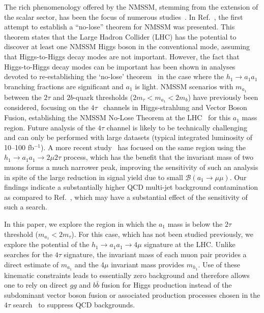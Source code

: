\documentclass[aps,prl,twocolumn,nofootinbib,superscriptaddress]{revtex4}
\begin{document}
The rich phenomenology offered by the NMSSM, stemming from the
extension of the scalar sector, has been the focus of numerous
studies~\cite{nmssm-ph1,nmssm-ph2,nmssm-ph2b,nmssm-ph3,nmssm-ph4,nmssm-ph5,nmssm-ph6,nmssm-ph6a,nmssm-ph7}.
In Ref.~\cite{nmssm-ph2}, the first attempt to establish a ``no-lose''
theorem for NMSSM was presented.  This theorem states that the Large
Hadron Collider (LHC) has the potential to discover at least one NMSSM
Higgs boson in the conventional mode, assuming that Higgs-to-Higgs
decay modes are not important.  However, the fact that Higgs-to-Higgs
decay modes can be important has been shown in analyses devoted to
re-establishing the `no-lose'
theorem~\cite{nmssm-ph2b,nmssm-ph3,nmssm-ph4,nmssm-ph5,nmssm-ph6,nmssm-ph6a,nmssm-ph7}
in the case where the $h_1\to a_1 a_1$ branching fractions are
significant and $a_1$ is light.  NMSSM scenarios with $m_{a_1}$
between the $2\tau$ and $2b$-quark thresholds ($2m_\tau < m_{a_1} <
2m_b$) have previously been considered, focusing on the
$4\tau$~\cite{nmssm-ph7} channels in Higgs-strahlung and Vector Boson
Fusion, establishing the NMSSM No-Lose Theorem at the
LHC~\cite{nmssm-ph7} for this $a_1$ mass region.  Future analysis of
the $4\tau$ channel is likely to be technically challenging and can
only be performed with large datasets (typical integrated luminosity
of 10--100 fb$^{-1}$).  A more recent study~\cite{2mu2tau-pheno} has
focused on the same region using the $h_1 \to a_1 a_1 \to 2\mu 2\tau$
process, which has the benefit that the invariant mass of two muons
forms a much narrower peak, improving the sensitivity of such an
analysis in spite of the large reduction in signal yield due to small
$\mathcal{B}(a_1 \to \mu \mu)$.  Our findings indicate a substantially higher
QCD multi-jet background contamination as compared to
Ref.~\cite{2mu2tau-pheno}, which may have a substantial effect of the
sensitivity of such a search.

In this paper, we explore the region in which the $a_1$ mass is below
the $2\tau$ threshold ($m_{a_1} < 2m_\tau$).  For this case, which has
not been studied previously, we explore the potential of the $h_1 \to
a_1 a_1 \to 4\mu$ signature at the LHC.  Unlike searches for the
$4\tau$ signature, the invariant mass of each muon pair provides a
direct estimate of $m_{a_1}$ and the 4$\mu$ invariant mass provides
$m_{h_1}$.  Use of these kinematic constraints leads to essentially
zero background and therefore allows one to rely on direct $gg$ and
$b\bar{b}$ fusion for Higgs production instead of the subdominant
vector boson fusion or associated production processes chosen in the
$4\tau$ search~\cite{nmssm-ph2} to suppress QCD backgrounds.
\end{document}
